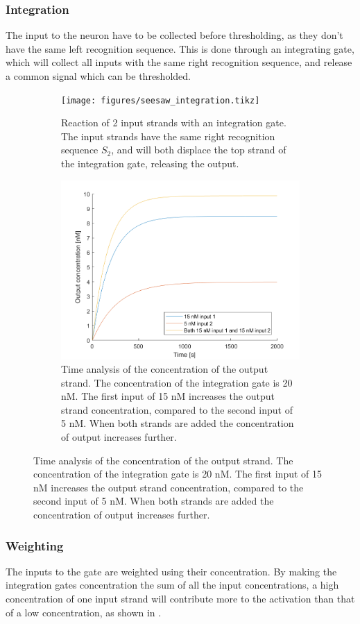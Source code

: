 \subsubsection{Integration}
The input to the neuron have to be collected before thresholding, as they don't have the same left recognition sequence. This is done through an integrating gate, which will collect all inputs with the same right recognition sequence, and release a common signal which can be thresholded.

\begin{figure}[H]
  \begin{subfigure}[t]{.49\textwidth}
    \texttt{[image: figures/seesaw\_integration.tikz]}
\caption{Reaction of 2 input strands with an integration gate. The input strands have the same right recognition sequence $S_2$, and will both displace the top strand of the integration gate, releasing the output.}
\label{}
\end{subfigure}
\hfill
\begin{subfigure}[t]{.49\columnwidth}
  \centering
\includegraphics[width=\linewidth]{images/integration.png}
\caption{Time analysis of the concentration of the output strand. The concentration of the integration gate is 20 nM. The first input of 15 nM increases the output strand concentration, compared to the second input of 5 nM. When both strands are added the concentration of output increases further.}
\label{}
\end{subfigure}
\label{seesaw_integration}
\end{figure}

\subsubsection{Weighting}
The inputs to the gate are weighted using their concentration. By making the integration gates concentration the sum of all the input concentrations, a high concentration of one input strand will contribute more to the activation than that of a low concentration, as shown in .

